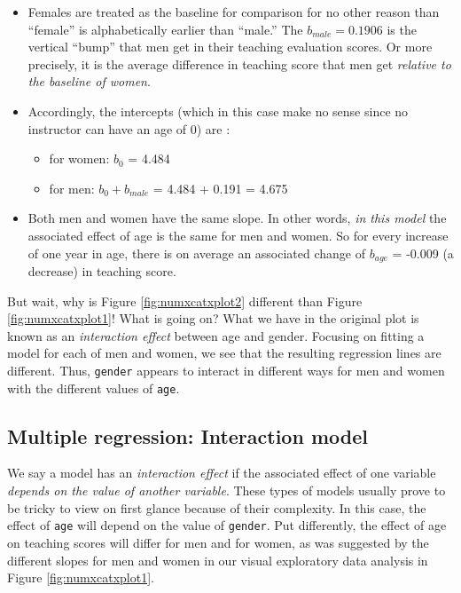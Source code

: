 \documentclass[12pt,]{krantz}
\providecommand{\tightlist}{%
  \setlength{\itemsep}{0pt}\setlength{\parskip}{0pt}}
\begin{document}
\begin{itemize}
\tightlist
\item
  Females are treated as the baseline for comparison for no other reason
  than ``female'' is alphabetically earlier than ``male.'' The
  \(b_{male} = 0.1906\) is the vertical ``bump'' that men get in their
  teaching evaluation scores. Or more precisely, it is the average
  difference in teaching score that men get \emph{relative to the
  baseline of women}.
\item
  Accordingly, the intercepts (which in this case make no sense since no
  instructor can have an age of 0) are :

  \begin{itemize}
  \tightlist
  \item
    for women: \(b_0\) = 4.484
  \item
    for men: \(b_0 + b_{male}\) = 4.484 + 0.191 = 4.675
  \end{itemize}
\item
  Both men and women have the same slope. In other words, \emph{in this
  model} the associated effect of age is the same for men and women. So
  for every increase of one year in age, there is on average an
  associated change of \(b_{age}\) = -0.009 (a decrease) in teaching
  score.
\end{itemize}

But wait, why is Figure \ref{fig:numxcatxplot2} different than Figure
\ref{fig:numxcatxplot1}! What is going on? What we have in the original
plot is known as an \emph{interaction effect} between age and gender.
Focusing on fitting a model for each of men and women, we see that the
resulting regression lines are different. Thus, \texttt{gender} appears
to interact in different ways for men and women with the different
values of \texttt{age}.

\subsection{Multiple regression: Interaction
model}\label{model4interactiontable}

We say a model has an \emph{interaction effect} if the associated effect
of one variable \emph{depends on the value of another variable}. These
types of models usually prove to be tricky to view on first glance
because of their complexity. In this case, the effect of \texttt{age}
will depend on the value of \texttt{gender}. Put differently, the effect
of age on teaching scores will differ for men and for women, as was
suggested by the different slopes for men and women in our visual
exploratory data analysis in Figure \ref{fig:numxcatxplot1}.
\end{document}
